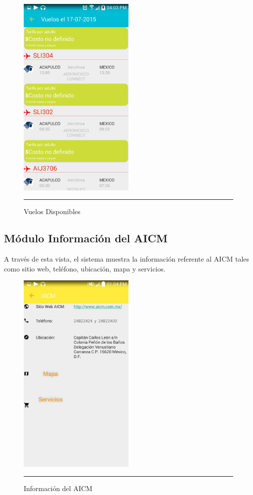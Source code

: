 \begin{figure}[h]
	\centering
		\includegraphics[width=0.5\textwidth]{Figuras/vdisponibles.png}
		\rule{30em}{0.5pt}
	\caption[Vuelos Disponibles]{Vuelos Disponibles}
	\label{fig:vuelosDisponibles}
\end{figure}
\clearpage

\subsection{Módulo Información del AICM}
A través de esta vista, el sistema muestra la información referente al AICM tales como sitio web, teléfono, ubicación, mapa y servicios.

\begin{figure}[h]
	\centering
		\includegraphics[width=0.5\textwidth]{Figuras/infoaicm.png}
		\rule{30em}{0.5pt}
	\caption[Información del AICM]{Información del AICM}
	\label{fig:infoAICM}
\end{figure}
\clearpage

